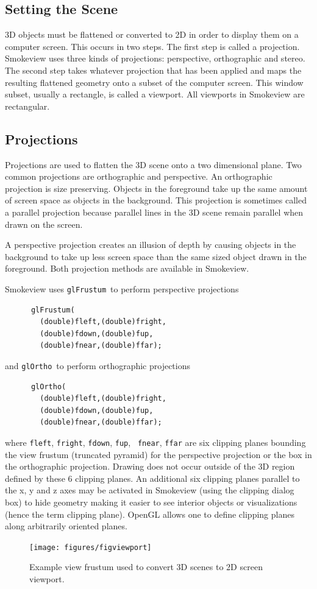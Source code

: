 \documentclass[11pt,twoside]{book}
\newcommand{\figoptions}{htp}
\begin{document}
\subsection{Setting the Scene}
3D objects must be flattened or converted to 2D in order to display them on a computer screen.  This occurs in two steps.  The first step is called a projection.  Smokeview uses three kinds of projections: perspective, orthographic and stereo.  The second step takes whatever projection that has been applied and maps the resulting flattened geometry onto a subset of the computer screen.  This window subset, usually a rectangle, is called a viewport.  All viewports in Smokeview are rectangular.

\subsection{Projections}
Projections are used to flatten the 3D scene onto a two dimensional plane. Two common projections are orthographic and perspective. An orthographic projection is size preserving. Objects in the foreground take up the same amount of screen space as objects in the background.
This projection is sometimes called a parallel projection because parallel lines in the 3D scene remain parallel when drawn on the screen.

A perspective
projection creates an illusion of depth by causing objects in the background to take up less screen space than the same sized object drawn in the foreground.  Both projection methods are available in Smokeview.

Smokeview uses {\tt glFrustum}\ to perform perspective projections
\begin{verbatim}
      glFrustum(
        (double)fleft,(double)fright,
        (double)fdown,(double)fup,
        (double)fnear,(double)ffar);
\end{verbatim}
and {\tt glOrtho}\ to perform orthographic projections
\begin{verbatim}
      glOrtho(
        (double)fleft,(double)fright,
        (double)fdown,(double)fup,
        (double)fnear,(double)ffar);
\end{verbatim}

\noindent where {\tt fleft}, {\tt fright}, {\tt fdown}, {\tt fup}, {\tt
fnear}, {\tt ffar} are six clipping planes bounding the view
frustum (truncated pyramid) for the perspective projection or the
box in the orthographic projection.  Drawing does not occur
outside of the 3D region defined by these 6 clipping planes. An
additional six clipping planes parallel to the x, y and z axes may
be activated in Smokeview (using the clipping dialog box) to hide
geometry making it easier to see interior objects or
visualizations (hence the term clipping plane).  OpenGL allows one to define clipping planes along
arbitrarily oriented planes.
\begin{figure}[\figoptions]
\begin{center}
\texttt{[image: figures/figviewport]}
\end{center}
\caption{Example view frustum used to convert 3D scenes to 2D
screen viewport.}
 \label{figfrustum}
\end{figure}
\end{document}
